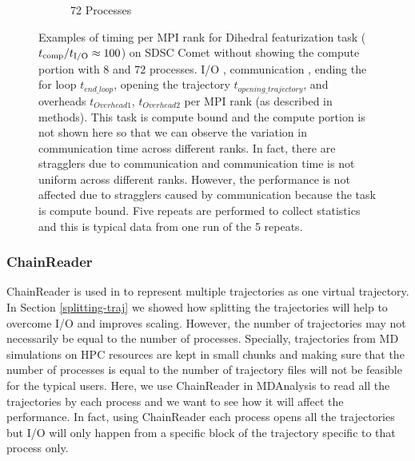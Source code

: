 \begin{figure}[ht!]
\begin{subfigure} {.47\textwidth}
  \caption{72 Processes}
  \label{fig:comm-rank-dihed-72}
\end{subfigure}
%
\caption{Examples of timing per MPI rank for Dihedral featurization task (${t}_{\text{comp}}/{t}_{\text{I/O}} \approx 100$) on SDSC Comet without showing the compute portion with 8 and 72 processes.
I/O \tIO, communication \tcomm, ending the for loop $t_{end\_loop}$, opening the trajectory $t_{opening\_trajectory}$, and overheads $t_{Overhead1}$,  
$t_{Overhead2}$ per MPI rank (as described in methods).
This task is compute bound and the compute portion is not shown here so that we can observe the variation in communication time across different ranks. 
In fact, there are stragglers due to communication and communication time is not uniform across different ranks. 
However, the performance is not affected due to stragglers caused by communication because the task is compute bound.
Five repeats are performed to collect statistics and this is typical data from one run of the 5 repeats.}
\label{fig:MPIwithIO-comm-dihed-rank}
\end{figure} 

\subsubsection{ChainReader}
ChainReader is used in  to represent multiple trajectories as one virtual trajectory. 
In Section \ref{splitting-traj} we showed how splitting the trajectories will help to overcome I/O and improves scaling. 
However, the number of trajectories may not necessarily be equal to the number of processes.
Specially, trajectories from MD simulations on HPC resources are kept in small chunks and making sure that the number of processes is equal to the number of trajectory files will not be feasible for the typical users. 
Here, we use ChainReader in MDAnalysis to read all the trajectories by each process and we want to see how it will affect the performance. 
In fact, using ChainReader each process opens all the trajectories but I/O will only happen from a specific block of the trajectory specific to that process only.
 
